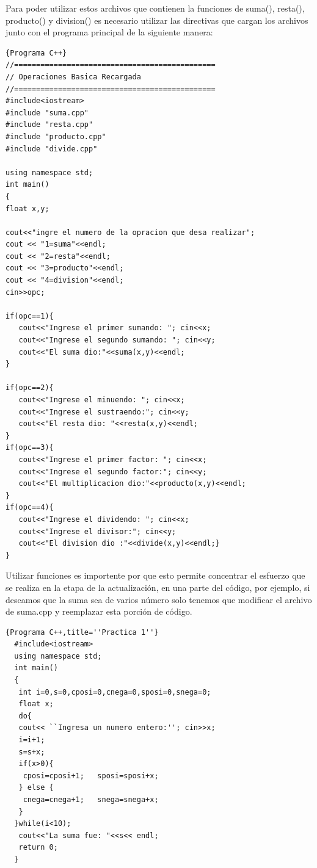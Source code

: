 \documentclass[a4paper,12pt,spanish]{article}
\newcommand\mylstcaption{}
\begin{document}
Para poder utilizar estos archivos que contienen la funciones de suma(), resta(), producto() y division() es necesario utilizar las directivas que cargan los archivos junto con el programa principal de la siguiente manera:

\renewcommand\mylstcaption{\textbf{OperBasi5.cpp}: función suma}

\begin{lstlisting}[frame=trBL,firstnumber=1,caption={\textbf{OperBasi5.cpp}}]{Programa C++}
//==============================================
// Operaciones Basica Recargada
//==============================================
#include<iostream>
#include "suma.cpp"
#include "resta.cpp"
#include "producto.cpp"
#include "divide.cpp"

using namespace std;
int main()
{
float x,y;

cout<<"ingre el numero de la opracion que desa realizar";
cout << "1=suma"<<endl;
cout << "2=resta"<<endl;
cout << "3=producto"<<endl;
cout << "4=division"<<endl;
cin>>opc;

if(opc==1){
   cout<<"Ingrese el primer sumando: "; cin<<x;
   cout<<"Ingrese el segundo sumando: "; cin<<y;
   cout<<"El suma dio:"<<suma(x,y)<<endl;
}

if(opc==2){
   cout<<"Ingrese el minuendo: "; cin<<x;
   cout<<"Ingrese el sustraendo:"; cin<<y;
   cout<<"El resta dio: "<<resta(x,y)<<endl;
}
if(opc==3){
   cout<<"Ingrese el primer factor: "; cin<<x;
   cout<<"Ingrese el segundo factor:"; cin<<y;
   cout<<"El multiplicacion dio:"<<producto(x,y)<<endl;
}
if(opc==4){
   cout<<"Ingrese el dividendo: "; cin<<x;
   cout<<"Ingrese el divisor:"; cin<<y;
   cout<<"El division dio :"<<divide(x,y)<<endl;}
}
\end{lstlisting}

Utilizar funciones es importente por que esto permite concentrar el esfuerzo que se realiza en la etapa de la actualización, en  una parte del código, por ejemplo, si deseamos que la suma sea de varios número solo tenemos que modificar el archivo de suma.cpp y reemplazar esta porción de código. \\

\renewcommand\mylstcaption{\textbf{sumanúmeros.cpp}: función suma}

\begin{lstlisting}[frame=trBL,caption={\textbf{sumanúmeros()}}]{Programa C++,title=''Practica 1''}
  #include<iostream>
  using namespace std;
  int main()
  {
   int i=0,s=0,cposi=0,cnega=0,sposi=0,snega=0;
   float x;
   do{
   cout<< ``Ingresa un numero entero:''; cin>>x;
   i=i+1;
   s=s+x;
   if(x>0){
    cposi=cposi+1;   sposi=sposi+x;
   } else {
    cnega=cnega+1;   snega=snega+x;
   }
  }while(i<10);
   cout<<"La suma fue: "<<s<< endl;
   return 0;
  }
\end{lstlisting}
\end{document}

